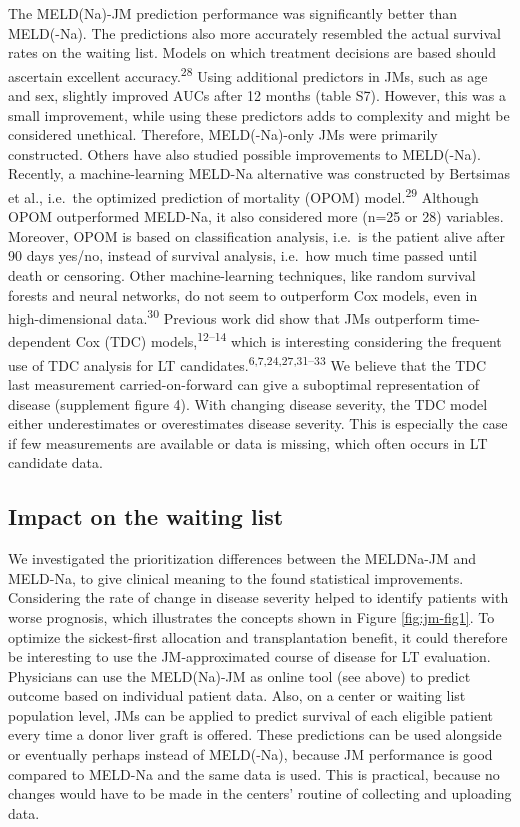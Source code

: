 \documentclass[11pt,english,]{book} %
\begin{document}
The MELD(Na)-JM prediction performance was significantly better than MELD(-Na). The predictions also more accurately resembled the actual survival rates on the waiting list. Models on which treatment decisions are based should ascertain excellent accuracy.\textsuperscript{28} Using additional predictors in JMs, such as age and sex, slightly improved AUCs after 12 months (table S7). However, this was a small improvement, while using these predictors adds to complexity and might be considered unethical. Therefore, MELD(-Na)-only JMs were primarily constructed. Others have also studied possible improvements to MELD(-Na). Recently, a machine-learning MELD-Na alternative was constructed by Bertsimas et al., i.e.~the optimized prediction of mortality (OPOM) model.\textsuperscript{29} Although OPOM outperformed MELD-Na, it also considered more (n=25 or 28) variables. Moreover, OPOM is based on classification analysis, i.e.~is the patient alive after 90 days yes/no, instead of survival analysis, i.e.~how much time passed until death or censoring. Other machine-learning techniques, like random survival forests and neural networks, do not seem to outperform Cox models, even in high-dimensional data.\textsuperscript{30} Previous work did show that JMs outperform time-dependent Cox (TDC) models,\textsuperscript{12--14} which is interesting considering the frequent use of TDC analysis for LT candidates.\textsuperscript{6,7,24,27,31--33} We believe that the TDC last measurement carried-on-forward can give a suboptimal representation of disease (supplement figure 4). With changing disease severity, the TDC model either underestimates or overestimates disease severity. This is especially the case if few measurements are available or data is missing, which often occurs in LT candidate data.

\hypertarget{impact-on-the-waiting-list-3}{%
\subsection*{Impact on the waiting list}\label{impact-on-the-waiting-list-3}}

We investigated the prioritization differences between the MELDNa-JM and MELD-Na, to give clinical meaning to the found statistical improvements. Considering the rate of change in disease severity helped to identify patients with worse prognosis, which illustrates the concepts shown in Figure \ref{fig:jm-fig1}. To optimize the sickest-first allocation and transplantation benefit, it could therefore be interesting to use the JM-approximated course of disease for LT evaluation. Physicians can use the MELD(Na)-JM as online tool (see above) to predict outcome based on individual patient data. Also, on a center or waiting list population level, JMs can be applied to predict survival of each eligible patient every time a donor liver graft is offered. These predictions can be used alongside or eventually perhaps instead of MELD(-Na), because JM performance is good compared to MELD-Na and the same data is used. This is practical, because no changes would have to be made in the centers' routine of collecting and uploading data.
\end{document}
